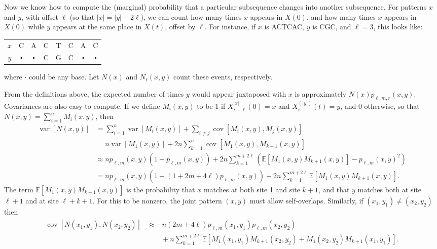 \documentclass{article}
\newcommand{\E}{\mathbb{E}}
\newcommand{\var}{\mathop{\mbox{var}}}
\newcommand{\cov}{\mathop{\mbox{cov}}}
\theoremstyle{plain}
\theoremstyle{definition}
\begin{document}
Now we know how to compute the (marginal) probability that a particular subsequence changes into another subsequence.
For patterns $x$ and $y$, with offset $\ell$ (so that $|x|=|y|+2\ell$),
we can count how many times $x$ appears in $X(0)$,
and how many times $x$ appears in $X(0)$ while $y$ appears at the same place in $X(t)$, offset by $\ell$.
For instance, if $x$ is ACTCAC, $y$ is CGC, and $\ell=3$, this looks like:
\begin{center}
\begin{tabular}{c|ccccccc}
 $x$ &  C  & A & C & T & C & A & C \\
 $y$ &  $\centerdot$  & $\centerdot$  & C & G & C & $\centerdot$  & $\centerdot$  
\end{tabular}
\end{center}
where $\cdot$ could be any base.
Let $N(x)$ and $N_\ell(x,y)$ count these events, respectively.

From the definitions above, 
the expected number of times $y$ would appear juxtaposed with $x$ is approximately $N(x)p_{\ell,m,r}(x,y)$.
Covariances are also easy to compute.
If we define $M_i(x,y)$ to be 1 if $X_{i-\ell}^{|x|}(0)=x$ and $X_i^({|y|})(t)=y$, and 0 otherwise,
so that $N(x,y) = \sum_{i=1}^n M_i(x,y)$, then
\begin{align}
  \var[N(x,y)] &= \sum_{i=1}^n \var[M_i(x,y)] + \sum_{i\neq j} \cov[M_i(x,y), M_j(x,y)] \\
  &= n \var[M_1(x,y)] + 2n\sum_{k=1}^n \cov[M_1(x,y),M_{k+1}(x,y)] \\
  &\approx n p_{\ell,m}(x,y)(1-p_{\ell,m}(x,y)) + 2n\sum_{k=1}^{m+2\ell} \left( \E[M_1(x,y) M_{k+1}(x,y)] - p_{\ell,m}(x,y)^2 \right) \\
  &= n p_{\ell,m}(x,y)(1-(1+2m+4\ell)p_{\ell,m}(x,y)) + 2n\sum_{k=1}^{m+2\ell} \E[M_1(x,y) M_{k+1}(x,y)] .
\end{align}
The term $\E[M_1(x,y) M_{k+1}(x,y)]$ is the probability that $x$ matches at both site 1 and site $k+1$,
and that $y$ matches both at site $\ell+1$ and at site $\ell+k+1$.
For this to be nonzero, the joint pattern $(x,y)$ must allow self-overlaps.
Similarly, if $(x_1,y_1) \neq (x_2,y_2)$ then
\begin{align}
  \begin{split}
    \cov[N(x_1,y_1),N(x_2,y_2)] 
    & \approx - n (2m+4\ell) p_{\ell,m}(x_1,y_1)p_{\ell,m}(x_2,y_2) \\
    & \qquad {} + n\sum_{k=1}^{m+2\ell} \E[M_1(x_1,y_1) M_{k+1}(x_2,y_2) + M_1(x_2,y_2) M_{k+1}(x_1,y_1)] .
  \end{split}
\end{align}
\end{document}
